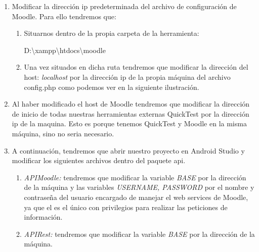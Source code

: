 \begin{enumerate}
	
	\item Modificar la dirección ip predeterminada del archivo de configuración de Moodle. Para ello tendremos que:
	\begin{enumerate}
		\item Situarnos dentro de la propia carpeta de la herramienta: 

D:\textbackslash{}xampp\textbackslash{}htdocs\textbackslash{}moodle
		\item Una vez situados en dicha ruta tendremos que modificar la dirección del host: \emph{localhost} por la dirección ip de la propia máquina del archivo config.php como podemos ver en la siguiente ilustración.
	\end{enumerate}		
	
	\item Al haber modificado el host de Moodle tendremos que modificar la dirección de inicio de todas nuestras herramientas externas QuickTest por la dirección ip de la maquina. Esto es porque tenemos QuickTest y Moodle en la misma máquina, sino no seria necesario. 
	
	\item A continuación, tendremos que abrir nuestro proyecto en Android Studio y modificar los siguientes archivos dentro del paquete api. 
	
	\begin{enumerate}
		
		\item \emph{APIMoodle:} tendremos que modificar la variable \emph{BASE} por la dirección de la máquina y las variables \emph{USERNAME, PASSWORD} por el nombre y contraseña del usuario encargado de manejar el web services de Moodle, ya que el es el único con privilegios para realizar las peticiones de información. 
		
		\item \emph{APIRest:} tendremos que modificar la variable \emph{BASE} por la dirección de la máquina. 
		
	\end{enumerate}
	 
\end{enumerate}

